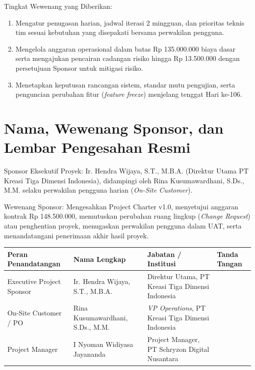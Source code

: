 \documentclass[11pt,a4paper]{article}
\newcommand{\thdr}[1]{\centering\arraybackslash\textbf{#1}}
\renewcommand{\arraystretch}{1.26}
\begin{document}
Tingkat Wewenang yang Diberikan:
\begin{enumerate}[leftmargin=1.5em, itemsep=1pt, topsep=1pt]
    \item Mengatur penugasan harian, jadwal iterasi 2 mingguan, dan prioritas teknis tim sesuai kebutuhan yang disepakati bersama perwakilan pengguna.
    \item Mengelola anggaran operasional dalam batas Rp 135.000.000 biaya dasar serta mengajukan pencairan cadangan risiko hingga Rp 13.500.000 dengan persetujuan Sponsor untuk mitigasi risiko.
    \item Menetapkan keputusan rancangan sistem, standar mutu pengujian, serta penguncian perubahan fitur (\textit{feature freeze}) menjelang tenggat Hari ke-106.
\end{enumerate}

\vspace{-6pt}
\section{Nama, Wewenang Sponsor, dan Lembar Pengesahan Resmi}

Sponsor Eksekutif Proyek: Ir. Hendra Wijaya, S.T., M.B.A. (Direktur Utama PT Kreasi Tiga Dimensi Indonesia), didampingi oleh Rina Kusumawardhani, S.Ds., M.M. selaku perwakilan pengguna harian (\textit{On-Site Customer}).

Wewenang Sponsor: Mengesahkan Project Charter v1.0, menyetujui anggaran kontrak Rp 148.500.000, memutuskan perubahan ruang lingkup (\textit{Change Request}) atau penghentian proyek, menugaskan perwakilan pengguna dalam UAT, serta menandatangani penerimaan akhir hasil proyek.

\vspace{2pt}
\noindent
{\renewcommand{\arraystretch}{1.02}\small
\begin{tabularx}{\textwidth}{| L{3.9cm} | L{3.8cm} | Y | C{2.5cm} |}
\hline
{} \thdr{Peran Penandatangan} & \thdr{Nama Lengkap} & \thdr{Jabatan / Institusi} & \thdr{Tanda Tangan} \\
\hline
Executive Project Sponsor & Ir. Hendra Wijaya, S.T., M.B.A. & Direktur Utama, PT Kreasi Tiga Dimensi Indonesia & \vspace{0.42cm} \\
\hline
On-Site Customer / PO & Rina Kusumawardhani, S.Ds., M.M. & \textit{VP Operations}, PT Kreasi Tiga Dimensi Indonesia & \vspace{0.42cm} \\
\hline
Project Manager & I Nyoman Widiyasa Jayananda & Project Manager, PT Schryzon Digital Nusantara & \vspace{0.42cm} \\
\hline
\end{tabularx}}
\end{document}
